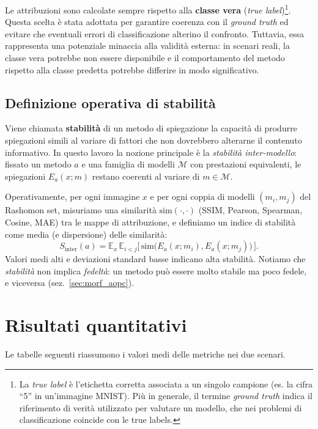 \documentclass[12pt,a4paper,oneside]{report}
\numberwithin{figure}{chapter}
\numberwithin{table}{chapter}
\begin{document}
Le attribuzioni sono calcolate sempre rispetto alla \textbf{classe vera}
(\textit{true label})\footnote{La \emph{true label} è l’etichetta corretta
      associata a un singolo campione (es. la cifra “5” in un’immagine MNIST). Più in
      generale, il termine \emph{ground truth} indica il riferimento di verità
      utilizzato per valutare un modello, che nei problemi di classificazione
      coincide con le true labels.}. Questa scelta è stata adottata per garantire
coerenza con il \emph{ground truth} ed evitare che eventuali errori di
classificazione alterino il confronto. Tuttavia, essa rappresenta una
potenziale minaccia alla validità esterna: in scenari reali, la classe vera
potrebbe non essere disponibile e il comportamento del metodo rispetto alla
classe predetta potrebbe differire in modo significativo.

\subsection{Definizione operativa di stabilità}
\label{sec:stabilita}
Viene chiamata \textbf{stabilità} di un metodo di spiegazione la capacità di
produrre spiegazioni simili al variare di fattori che non dovrebbero alterarne
il contenuto informativo. In questo lavoro la nozione principale è la
\emph{stabilità inter-modello}: fissato un metodo
$a$ e una famiglia di modelli $\mathcal{M}$ con prestazioni equivalenti, le
spiegazioni $E_a(x;m)$ restano coerenti al variare di $m \in \mathcal{M}$.

Operativamente, per ogni immagine $x$ e per ogni coppia di modelli $(m_i,m_j)$
del Rashomon set, misuriamo una similarità $\mathrm{sim}(\cdot,\cdot)$ (SSIM,
Pearson, Spearman, Cosine, MAE) tra le mappe di attribuzione, e definiamo un
indice di stabilità come media (e dispersione) delle similarità:
\[
      S_{\text{inter}}(a)
      = \mathbb{E}_{x}\,\mathbb{E}_{i<j}\big[\,\mathrm{sim}\big(E_a(x;m_i),E_a(x;m_j)\big)\,\big].
\]
Valori medi alti e deviazioni standard basse indicano alta stabilità. Notiamo
che \emph{stabilità} non implica \emph{fedeltà}: un metodo può essere molto
stabile ma poco fedele, e viceversa (sez.~\ref{sec:morf_aopc}).

\section{Risultati quantitativi}
Le tabelle seguenti riassumono i valori medi delle metriche nei due scenari.

\FloatBarrier
{}
\end{document}
